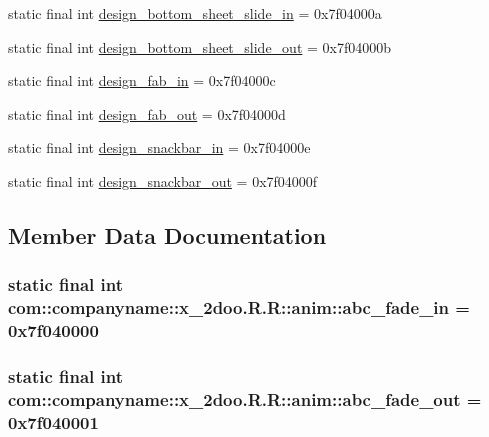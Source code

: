\begin{CompactItemize}
\item 
static final int \hyperlink{classcom_1_1companyname_1_1x__2doo_1_1_r_1_1anim_6e7b269b6d408add7e2d9fcc39c06d15}{design\_\-bottom\_\-sheet\_\-slide\_\-in} = 0x7f04000a
\item 
static final int \hyperlink{classcom_1_1companyname_1_1x__2doo_1_1_r_1_1anim_351ee7255762f552b3920937b203b2cf}{design\_\-bottom\_\-sheet\_\-slide\_\-out} = 0x7f04000b
\item 
static final int \hyperlink{classcom_1_1companyname_1_1x__2doo_1_1_r_1_1anim_c6ed3c7aa0474b9ad3e4f5c407220468}{design\_\-fab\_\-in} = 0x7f04000c
\item 
static final int \hyperlink{classcom_1_1companyname_1_1x__2doo_1_1_r_1_1anim_5796f4473bc9aee41d8d8fb4fe0fa7a8}{design\_\-fab\_\-out} = 0x7f04000d
\item 
static final int \hyperlink{classcom_1_1companyname_1_1x__2doo_1_1_r_1_1anim_5decf6c4d3971397323de37c00589704}{design\_\-snackbar\_\-in} = 0x7f04000e
\item 
static final int \hyperlink{classcom_1_1companyname_1_1x__2doo_1_1_r_1_1anim_2474f5610d037f04f8921ed93a16359d}{design\_\-snackbar\_\-out} = 0x7f04000f
\end{CompactItemize}


\subsection{Member Data Documentation}
\hypertarget{classcom_1_1companyname_1_1x__2doo_1_1_r_1_1anim_7f1f86d386f7b6f39f806538e538be10}{
\subsubsection[{abc\_\-fade\_\-in}]{\setlength{\rightskip}{0pt plus 5cm}static final int com::companyname::x\_\-2doo.R.R::anim::abc\_\-fade\_\-in = 0x7f040000}}
\label{classcom_1_1companyname_1_1x__2doo_1_1_r_1_1anim_7f1f86d386f7b6f39f806538e538be10}


\hypertarget{classcom_1_1companyname_1_1x__2doo_1_1_r_1_1anim_b918f3f15e0a2e507c19b64c30100028}{
\subsubsection[{abc\_\-fade\_\-out}]{\setlength{\rightskip}{0pt plus 5cm}static final int com::companyname::x\_\-2doo.R.R::anim::abc\_\-fade\_\-out = 0x7f040001}}
\label{classcom_1_1companyname_1_1x__2doo_1_1_r_1_1anim_b918f3f15e0a2e507c19b64c30100028}


